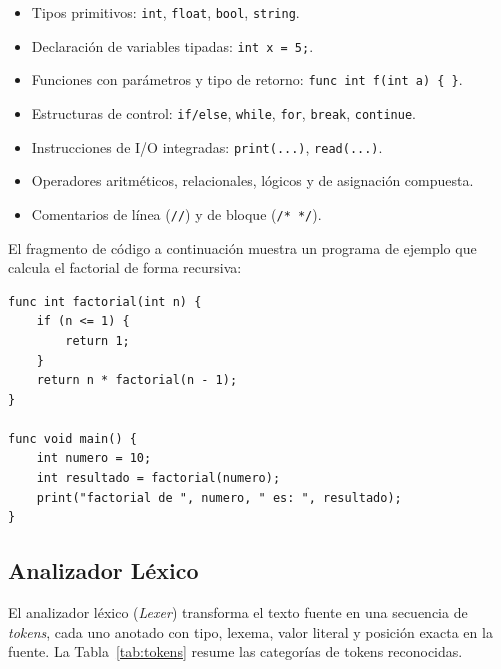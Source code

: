 \documentclass[conference]{IEEEtran}
\begin{document}
\begin{itemize}
    \item Tipos primitivos: \texttt{int}, \texttt{float}, \texttt{bool}, \texttt{string}.
    \item Declaración de variables tipadas: \texttt{int x = 5;}.
    \item Funciones con parámetros y tipo de retorno: \texttt{func int f(int a)~\{~\}}.
    \item Estructuras de control: \texttt{if/else}, \texttt{while}, \texttt{for}, \texttt{break}, \texttt{continue}.
    \item Instrucciones de I/O integradas: \texttt{print(...)}, \texttt{read(...)}.
    \item Operadores aritméticos, relacionales, lógicos y de asignación compuesta.
    \item Comentarios de línea (\texttt{//}) y de bloque (\texttt{/* */}).
\end{itemize}

El fragmento de código a continuación muestra un programa de ejemplo que calcula el factorial de forma recursiva:

\begin{lstlisting}[language=MiniLang, caption={factorial.ml -- programa de prueba en MiniLang}]
func int factorial(int n) {
    if (n <= 1) {
        return 1;
    }
    return n * factorial(n - 1);
}

func void main() {
    int numero = 10;
    int resultado = factorial(numero);
    print("factorial de ", numero, " es: ", resultado);
}
\end{lstlisting}

\subsection{Analizador Léxico}

El analizador léxico (\textit{Lexer}) transforma el texto fuente en una secuencia de \textit{tokens}, cada uno anotado con tipo, lexema, valor literal y posición exacta en la fuente. La Tabla~\ref{tab:tokens} resume las categorías de tokens reconocidas.
\end{document}
